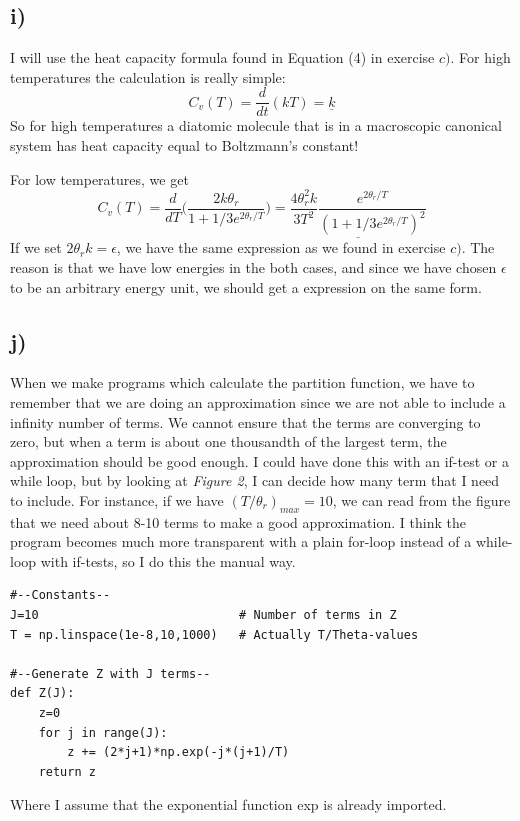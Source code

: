 \documentclass{scrartcl}
\begin{document}
\subsection*{i)}
I will use the heat capacity formula found in Equation (4) in exercise $c)$. For high temperatures the calculation is really simple:
\begin{equation}
C_v(T)=\frac{d}{dt}(kT)=\underline{k}
\end{equation}
So for high temperatures a diatomic molecule that is in a macroscopic canonical system has heat capacity equal to Boltzmann's constant!\par\vspace{3mm}
For low temperatures, we get
\begin{equation}
C_v(T)=\frac{d}{dT}\bigg(\frac{2k\theta_r}{1+1/3e^{2\theta_r/T}}\bigg)=\underline{\frac{4\theta_r^2k}{3T^2}\frac{e^{2\theta_r/T}}{(1+1/3e^{2\theta_r/T})^2}}
\end{equation}
If we set $2\theta_rk=\epsilon$, we have the same expression as we found in exercise $c)$. The reason is that we have low energies in the both cases, and since we have chosen $\epsilon$ to be an arbitrary energy unit, we should get a expression on the same form. 

\subsection*{j)}
When we make programs which calculate the partition function, we have to remember that we are doing an approximation since we are not able to include a infinity number of terms. We cannot ensure that the terms are converging to zero, but when a term is about one thousandth of the largest term, the approximation should be good enough. I could have done this with an if-test or a while loop, but by looking at \textit{Figure 2}, I can decide how many term that I need to include. For instance, if we have $(T/\theta_r)_{max}=10$, we can read from the figure that we need about 8-10 terms to make a good approximation. I think the program becomes much more transparent with a plain for-loop instead of a while-loop with if-tests, so I do this the manual way.
\begin{lstlisting}
#--Constants--
J=10                            # Number of terms in Z
T = np.linspace(1e-8,10,1000)   # Actually T/Theta-values

#--Generate Z with J terms--
def Z(J):
    z=0
    for j in range(J):
	    z += (2*j+1)*np.exp(-j*(j+1)/T)
    return z
\end{lstlisting}
Where I assume that the exponential function exp is already imported. 
\end{document}
